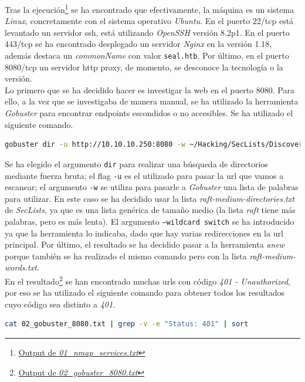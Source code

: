 Tras la ejecución\footnote{\href{https://github.com/VictorNS69/TFM/blob/main/machines/seal/01_nmap_services.txt}{Output de \textit{01\_nmap\_services.txt}}} se ha encontrado que efectivamente, la máquina es un sistema \textit{Linux}, concretamente con el sistema operativo \textit{Ubuntu}. En el puerto 22/\acrshort{tcp} está levantado un servidor \acrshort{ssh}, está utilizando \textit{OpenSSH}\cite{openssh} versión 8.2p1. En el puerto 443/\acrshort{tcp} se ha encontrado desplegado un servidor \textit{Nginx}\cite{nginx} en la versión 1.18, además destaca  un \textit{commonName} con valor \texttt{seal.htb}. Por último, en el puerto 8080/\acrshort{tcp} un servidor \acrshort{http} proxy, de momento, se desconoce la tecnología o la versión.\\

Lo primero que se ha decidido hacer es investigar la web en el puerto 8080. Para ello, a la vez que se investigaba de manera manual, se ha utilizado la herramienta \textit{Gobuster}\cite{gobuster} para encontrar endpoints escondidos o no accesibles. Se ha utilizado el siguiente comando.
\begin{lstlisting}[language=bash]
gobuster dir -u http://10.10.10.250:8080 -w ~/Hacking/SecLists/Discovery/Web-Content/raft-medium-directories.txt --wildcard switch | anew 02_gobuster_8080.txt
\end{lstlisting}

Se ha elegido el argumento \texttt{dir} para realizar una búsqueda de directorios mediante fuerza bruta; el flag \texttt{-u} es el utilizado para pasar la \acrshort{url} que vamos  a escanear; el argumento \texttt{-w} se utiliza para pasarle a \textit{Gobuster} una lista de palabras para utilizar. En este caso se ha decidido usar la lista \textit{raft-medium-directories.txt} de \textit{SecLists}\cite{seclists}, ya que es una lista genérica de tamaño medio (la lista \textit{raft} tiene más palabras, pero es más lenta). El argumento \texttt{--wildcard switch} se ha introducido ya que la herramienta lo indicaba, dado que hay varias redirecciones en la \acrshort{url} principal. Por último, el resultado se ha decidido pasar a la herramienta \textit{anew}\cite{anew} porque también se ha realizado el mismo comando pero con la lista \textit{raft-medium-words.txt}.\\

En el resultado\footnote{\href{https://github.com/VictorNS69/TFM/blob/main/machines/seal/02_gobuster_8080.txt}{Output de \textit{02\_gobuster\_8080.txt}}} se han encontrado muchas \acrshort{url}s con código \textit{401 - Unauthorized}, por eso se ha utilizado el siguiente comando para obtener todos los resultados cuyo código sea distinto a \textit{401}.
\begin{lstlisting}[language=bash]
cat 02_gobuster_8080.txt | grep -v -e "Status: 401" | sort
\end{lstlisting}

